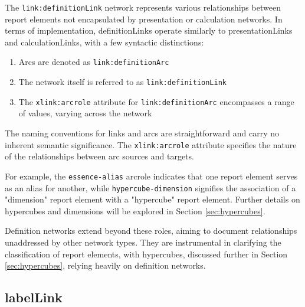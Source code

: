 The \texttt{link:definitionLink} network represents various relationships between report elements not encapsulated by presentation or calculation networks.  
In terms of implementation, definitionLinks operate similarly to presentationLinks and calculationLinks,  
with a few syntactic distinctions:

\begin{enumerate}  
    \item Arcs are denoted as \texttt{link:definitionArc}  
    \item The network itself is referred to as \texttt{link:definitionLink}  
    \item The \texttt{xlink:arcrole} attribute for \texttt{link:definitionArc} encompasses a range of values, varying across the network  
\end{enumerate}  

The naming conventions for links and arcs are straightforward and carry no inherent semantic significance.  
The \texttt{xlink:arcrole} attribute specifies the nature of the relationships between arc sources and targets.  

For example, the \texttt{essence-alias} arcrole indicates that one report element serves as an alias for another,  
while \texttt{hypercube-dimension} signifies the association of a "dimension" report element with a "hypercube" report element.  
Further details on hypercubes and dimensions will be explored in Section \ref{sec:hypercubes}.  

Definition networks extend beyond these roles, aiming to document relationships unaddressed by other network types.  
They are instrumental in clarifying the classification of report elements,  
with hypercubes, discussed further in Section \ref{sec:hypercubes}, relying heavily on definition networks.

\subsection{labelLink}
\label{sec:labelLink}



